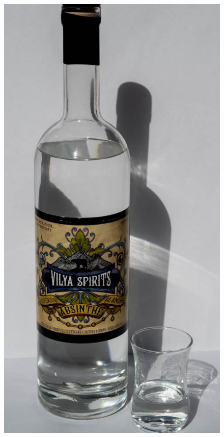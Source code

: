 \documentclass[12pt,letterpaper,oneside]{memoir}
\begin{document}
  \begin{figure}
    \vspace{-15pt}
    \includegraphics[width=\linewidth]{../../assets/tasting/naa-vilya-blanche.jpg}
    \vspace{-30pt}
  \end{figure}
\end{document}
